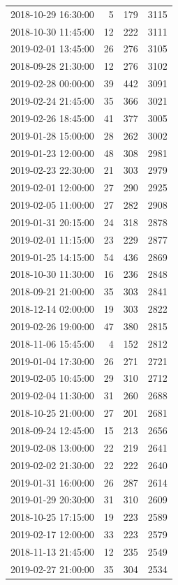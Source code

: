 \begin{tabular}{lrrr}
2018-10-29 16:30:00 & 5 & 179 & 3115 \\
2018-10-30 11:45:00 & 12 & 222 & 3111 \\
2019-02-01 13:45:00 & 26 & 276 & 3105 \\
2018-09-28 21:30:00 & 12 & 276 & 3102 \\
2019-02-28 00:00:00 & 39 & 442 & 3091 \\
2019-02-24 21:45:00 & 35 & 366 & 3021 \\
2019-02-26 18:45:00 & 41 & 377 & 3005 \\
2019-01-28 15:00:00 & 28 & 262 & 3002 \\
2019-01-23 12:00:00 & 48 & 308 & 2981 \\
2019-02-23 22:30:00 & 21 & 303 & 2979 \\
2019-02-01 12:00:00 & 27 & 290 & 2925 \\
2019-02-05 11:00:00 & 27 & 282 & 2908 \\
2019-01-31 20:15:00 & 24 & 318 & 2878 \\
2019-02-01 11:15:00 & 23 & 229 & 2877 \\
2019-01-25 14:15:00 & 54 & 436 & 2869 \\
2018-10-30 11:30:00 & 16 & 236 & 2848 \\
2018-09-21 21:00:00 & 35 & 303 & 2841 \\
2018-12-14 02:00:00 & 19 & 303 & 2822 \\
2019-02-26 19:00:00 & 47 & 380 & 2815 \\
2018-11-06 15:45:00 & 4 & 152 & 2812 \\
2019-01-04 17:30:00 & 26 & 271 & 2721 \\
2019-02-05 10:45:00 & 29 & 310 & 2712 \\
2019-02-04 11:30:00 & 31 & 260 & 2688 \\
2018-10-25 21:00:00 & 27 & 201 & 2681 \\
2018-09-24 12:45:00 & 15 & 213 & 2656 \\
2019-02-08 13:00:00 & 22 & 219 & 2641 \\
2019-02-02 21:30:00 & 22 & 222 & 2640 \\
2019-01-31 16:00:00 & 26 & 287 & 2614 \\
2019-01-29 20:30:00 & 31 & 310 & 2609 \\
2018-10-25 17:15:00 & 19 & 223 & 2589 \\
2019-02-17 12:00:00 & 33 & 223 & 2579 \\
2018-11-13 21:45:00 & 12 & 235 & 2549 \\
2019-02-27 21:00:00 & 35 & 304 & 2534 \\

\end{tabular}

